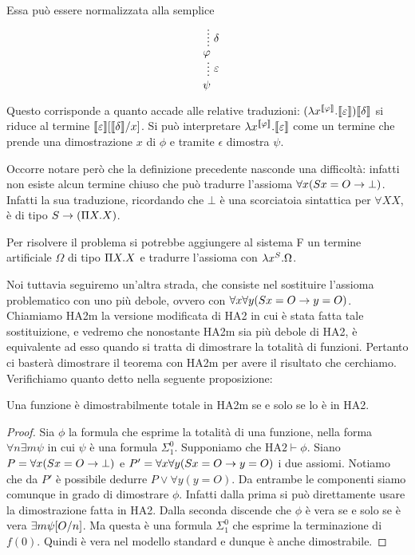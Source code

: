 \documentclass[]{marticle}
\begin{document}
Essa pu\`o essere normalizzata alla semplice 
\[
    \begin{prooftree}
        \hypo{}
        \ellipsis{$\delta$}{\phi}
        \ellipsis{$\epsilon$}{\psi}
    \end{prooftree}
\]

Questo corrisponde a quanto accade alle relative traduzioni: $(\l x^{\cod{\phi}}.
\cod{\epsilon})\cod{\delta}$ si riduce al termine
$\cod{\epsilon}\sub{\cod{\delta}}{x}$. Si pu\`o interpretare $\l x^{\cod{\phi}}.
\cod{\epsilon}$ come un termine che prende una dimostrazione $x$ di $\phi$ e
tramite $\epsilon$ dimostra $\psi$.

Occorre notare per\`o che la definizione precedente nasconde una difficolt\`a:
infatti non esiste alcun termine chiuso che pu\`o tradurre l'assioma $\forall x
(Sx=O \rar \bot)$. Infatti la sua traduzione, ricordando che $\bot$ \`e una
scorciatoia sintattica per $\forall XX$, \`e di tipo $S\rar (\P X.X)$. 

Per risolvere il problema si potrebbe aggiungere al sistema F un termine
artificiale $\Omega$ di tipo $\P X.X$ e tradurre l'assioma con $\l x^S.\Omega$.

Noi tuttavia seguiremo un'altra strada, che consiste nel sostituire l'assioma
problematico con uno pi\`u debole, ovvero con $\forall x \forall y (Sx=O\rar
y=O)$. Chiamiamo HA2m la versione modificata di HA2 in cui \`e stata fatta
tale sostituizione, e vedremo che nonostante HA2m sia pi\`u debole di HA2, \`e
equivalente ad esso quando si tratta di dimostrare la totalit\`a di funzioni.
Pertanto ci baster\`a dimostrare il teorema con HA2m per avere il risultato che
cerchiamo. Verifichiamo quanto detto nella seguente proposizione:

\begin{block}[Proposizione]
    Una funzione \`e dimostrabilmente totale in HA2m se e solo se lo \`e in HA2.
\end{block}
\begin{proof}
    Sia $\phi$ la formula che esprime la totalit\`a di una funzione, nella forma 
    $\forall n \exists m \psi$ in cui $\psi$ \`e una formula $\Sigma^0_1$.
    Supponiamo che $\text{HA2}\vdash\phi$.
    Siano $P = \forall x (Sx=O\rar \bot)$ e $P' = \forall x \forall y (Sx=O\rar
    y=O)$ i due assiomi. Notiamo che da $P'$ \`e possibile dedurre $P \lor
    \forall y(y=O)$. Da entrambe le componenti siamo comunque in grado di
    dimostrare $\phi$. Infatti dalla prima si pu\`o direttamente usare la
    dimostrazione fatta in HA2. Dalla seconda discende che $\phi$ \`e vera se e
    solo se \`e vera $\exists m \psi\sub{O}{n}$. Ma questa \`e una formula
    $\Sigma^0_1$ che esprime la terminazione di $f(0)$. Quindi \`e vera nel
    modello standard e dunque \`e anche dimostrabile.
\end{proof}
\end{document}
